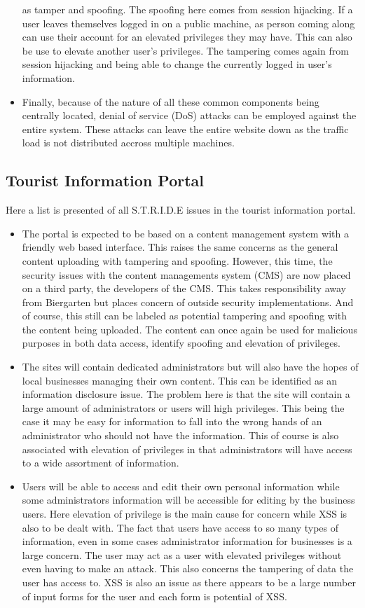 \documentclass[paper=a4, fontsize=11pt]{scrartcl} %
\numberwithin{equation}{section} %
\numberwithin{figure}{section} %
\numberwithin{table}{section} %
\begin{document}
\begin{itemize}
as tamper and spoofing. The spoofing here comes from session hijacking. If a user leaves themselves logged in on a public 
machine, as person coming along can use their account for an elevated privileges they may have. This can also be use to elevate
another user's privileges. The tampering comes again from session hijacking and being able to change the currently logged in
user's information.
\item Finally, because of the nature of all these common components being centrally located, denial of service (DoS) attacks
can be employed against the entire system. These attacks can leave the entire website down as the traffic load is not distributed
accross multiple machines.
\end{itemize}

\subsection{Tourist Information Portal}
Here a list is presented of all S.T.R.I.D.E issues in the tourist information portal.

\begin{itemize}
\item The portal is expected to be based on a content management system with a friendly web based interface. This raises the
same concerns as the general content uploading with tampering and spoofing. However, this time, the security issues with
the content managements system (CMS) are now placed on a third party, the developers of the CMS. This takes responsibility
away from Biergarten but places concern of outside security implementations. And of course, this still can be labeled as potential
tampering and spoofing with the content being uploaded. The content can once again be used for malicious purposes in both
data access, identify spoofing and elevation of privileges.
\item The sites will contain dedicated administrators but will also have the hopes of local businesses managing their
own content. This can be identified as an information disclosure issue. The problem here is that the site will contain a large
amount of administrators or users will high privileges. This being the case it may be easy for information to fall into the
wrong hands of an administrator who should not have the information. This of course is also associated with elevation of
privileges in that administrators will have access to a wide assortment of information.
\item Users will be able to access and edit their own personal information while some administrators information will be
accessible for editing by the business users. Here elevation of privilege is the main cause for concern while XSS is also
to be dealt with. The fact that users have access to so many types of information, even in some cases administrator information
for businesses is a large concern. The user may act as a user with elevated privileges without even having to make an attack.
This also concerns the tampering of data the user has access to. XSS is also an issue as there appears to be a large number
of input forms for the user and each form is potential of XSS.
\end{itemize}
\end{document}
